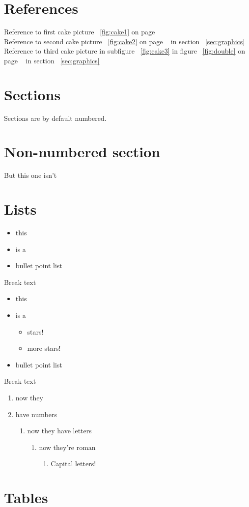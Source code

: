 \documentclass[a4paper,12pt]{article}
\begin{document}
\section{References}
Reference to first cake picture  ~\ref{fig:cake1} on page ~\pageref{fig:cake1} \\
Reference to second cake picture ~\ref{fig:cake2} on page ~\pageref{fig:cake2} in section ~\ref{sec:graphics} \\
Reference to third cake picture in subfigure ~\ref{fig:cake3} in  figure ~\ref{fig:double} on page ~\pageref{fig:cake3} in section ~\ref{sec:graphics}

\section{Sections}
Sections are by default numbered.
\section*{Non-numbered section}
But this one isn't
\section{Lists}
\begin{itemize}
\item this
\item is a
\item bullet point list
\end{itemize}
Break text
\begin{itemize}
\item this 
\item is a 
	\begin{itemize}
		\item stars!
		\item more stars!
	\end{itemize}
\item bullet point list
\end{itemize}
Break text
\begin{enumerate}
\item now they
\item have numbers
	\begin{enumerate}
	\item now they have letters
		\begin{enumerate}
		\item now they're roman
			\begin{enumerate}
			\item Capital letters!
			\end{enumerate}
		\end{enumerate}
	\end{enumerate}
\end{enumerate}

\section{Tables}
\end{document}
